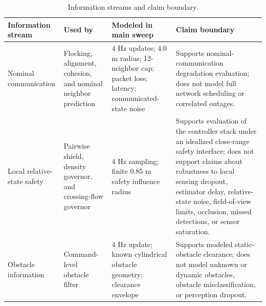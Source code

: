 \begin{table}[t]
\centering
\small
\caption{Information streams and claim boundary.}
\label{tab:information-streams}
\begin{tabular}{p{}p{}p{}p{}}
\toprule
Information stream & Used by & Modeled in main sweep & Claim boundary \\
\midrule
Nominal communication & Flocking, alignment, cohesion, and nominal neighbor prediction & 4 Hz updates; 4.0 m radius; 12-neighbor cap; packet loss; latency; communicated-state noise & Supports nominal-communication degradation evaluation; does not model full network scheduling or correlated outages. \\
Local relative-state safety & Pairwise shield, density governor, and crossing-flow governor & 4 Hz sampling; finite 0.85 m safety influence radius & Supports evaluation of the controller stack under an idealized close-range safety interface; does not support claims about robustness to local sensing dropout, estimator delay, relative-state noise, field-of-view limits, occlusion, missed detections, or sensor saturation. \\
Obstacle information & Command-level obstacle filter & 4 Hz update; known cylindrical obstacle geometry; clearance envelope & Supports modeled static-obstacle clearance; does not model unknown or dynamic obstacles, obstacle misclassification, or perception dropout. \\
\bottomrule
\end{tabular}
\end{table}
